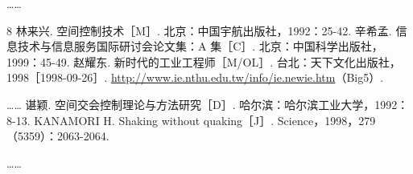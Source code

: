 ……

\begin{thebibliography}{8}
 林来兴. 空间控制技术［M］. 北京：中国宇航出版社，1992：25-42.
 辛希孟. 信息技术与信息服务国际研讨会论文集：A 集［C］. 北京：中国科学出版社，1999：45-49.
 赵耀东. 新时代的工业工程师［M/OL］. 台北：天下文化出版社，1998［1998-09-26］. \url{http://www.ie.nthu.edu.tw/info/ie.newie.htm}（Big5）.
\item[] ……
 谌颖. 空间交会控制理论与方法研究［D］. 哈尔滨：哈尔滨工业大学，1992：8-13.
 KANAMORI H. Shaking without quaking［J］. Science，1998，279（5359）：2063-2064.
\item[] ……
\end{thebibliography}

